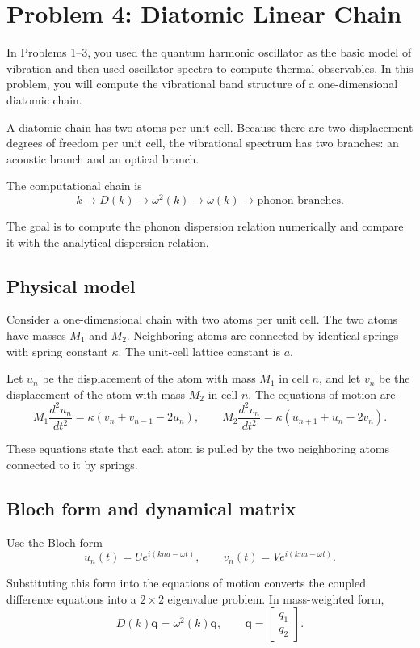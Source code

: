 \section{Problem 4: Diatomic Linear Chain}

In Problems 1--3, you used the quantum harmonic oscillator as the basic model of vibration and then used oscillator spectra to compute thermal observables. In this problem, you will compute the vibrational band structure of a one-dimensional diatomic chain.

A diatomic chain has two atoms per unit cell. Because there are two displacement degrees of freedom per unit cell, the vibrational spectrum has two branches: an acoustic branch and an optical branch.

The computational chain is
\[
k
\longrightarrow
D(k)
\longrightarrow
\omega^2(k)
\longrightarrow
\omega(k)
\longrightarrow
\text{phonon branches}.
\]

The goal is to compute the phonon dispersion relation numerically and compare it with the analytical dispersion relation.

\subsection{Physical model}

Consider a one-dimensional chain with two atoms per unit cell. The two atoms have masses \(M_1\) and \(M_2\). Neighboring atoms are connected by identical springs with spring constant \(\kappa\). The unit-cell lattice constant is \(a\).

Let \(u_n\) be the displacement of the atom with mass \(M_1\) in cell \(n\), and let \(v_n\) be the displacement of the atom with mass \(M_2\) in cell \(n\). The equations of motion are
\[
M_1\frac{d^2u_n}{dt^2}
=
\kappa(v_n+v_{n-1}-2u_n),
\qquad
M_2\frac{d^2v_n}{dt^2}
=
\kappa(u_{n+1}+u_n-2v_n).
\]

These equations state that each atom is pulled by the two neighboring atoms connected to it by springs.

\subsection{Bloch form and dynamical matrix}

Use the Bloch form
\[
u_n(t)=Ue^{i(kna-\omega t)},
\qquad
v_n(t)=Ve^{i(kna-\omega t)}.
\]

Substituting this form into the equations of motion converts the coupled difference equations into a \(2\times2\) eigenvalue problem. In mass-weighted form,
\[
D(k)\mathbf q=\omega^2(k)\mathbf q,
\qquad
\mathbf q=
\begin{bmatrix}
q_1\\
q_2
\end{bmatrix}.
\]

